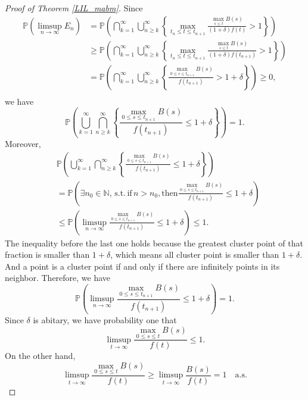 \documentclass[main.tex]{subfiles}
\begin{document}
\begin{proof}[Proof of Theorem \ref{LIL_mabm}]
Since
\begin{align*}
	\mathbb{P}(\limsup\limits_{n\to\infty}E_n) &= \mathbb{P}\left(\bigcap^\infty_{k=1}\bigcup^\infty_{n\geqslant k}\left\{\max\limits_{t_n\leqslant t\leqslant t_{n+1}}\frac{\max\limits_{s\leqslant t}B(s)}{(1+\delta)f(t)}>1\right\}\right)\\
	&\geqslant\mathbb{P}\left(\bigcap^\infty_{k=1}\bigcup^\infty_{n\geqslant k}\left\{\max\limits_{t_n\leqslant t\leqslant t_{n+1}}\frac{\max\limits_{s\leqslant t}B(s)}{(1+\delta)f(t_{n+1})}>1\right\}\right)\\
	&=\mathbb{P}\left(\bigcap^\infty_{k=1}\bigcup^\infty_{n\geqslant k}\left\{\frac{\max\limits_{0\leqslant s\leqslant t_{n+1}}B(s)}{f(t_{n+1})}>1+\delta\right\}\right)\geqslant0,\\
\end{align*}
we have
$$\mathbb{P}\left(\bigcup^\infty_{k=1}\bigcap^\infty_{n\geqslant k}\left\{\frac{\max\limits_{0\leqslant s\leqslant t_{n+1}}B(s)}{f(t_{n+1})}\leqslant1+\delta\right\}\right)=1.$$
Moreover,
\begin{align*}
	&\mathbb{P}\left(\bigcup^\infty_{k=1}\bigcap^\infty_{n\geqslant k}\left\{\frac{\max\limits_{0\leqslant s\leqslant t_{n+1}}B(s)}{f(t_{n+1})}\leqslant1+\delta\right\}\right)\\
	&=\mathbb{P}\left(\exists n_0\in\mathbb{N}, \,\mathrm{s.t.}\,\mathrm{if}\,n>n_0\mathrm{, then}\frac{\max\limits_{0\leqslant s\leqslant t_{n+1}}B(s)}{f(t_{n+1})}\leqslant1+\delta\right)\\
	&\leqslant\mathbb{P}\left(\limsup\limits_{n\to\infty}\frac{\max\limits_{0\leqslant s\leqslant t_{n+1}}B(s)}{f(t_{n+1})}\leqslant1+\delta\right)\leqslant1.
\end{align*}
The inequality before the last one holds because the greatest cluster point of that fraction is smaller than $1+\delta$, which means all cluster point is smaller than $1+\delta$. And a point is a cluster point if and only if there are infinitely points in its neighbor. Therefore, we have 
$$\mathbb{P}\left(\limsup\limits_{n\to\infty}\frac{\max\limits_{0\leqslant s\leqslant t_{n+1}}B(s)}{f(t_{n+1})}\leqslant1+\delta\right)=1.$$
Since $\delta$ is abitary, we have probability one that
\begin{equation}
\label{lilmbm1}
	\limsup\limits_{t\to\infty}\frac{\max\limits_{0\leqslant s\leqslant t}B(s)}{f(t)}\leqslant1.
\end{equation}
On the other hand, 
\begin{equation}
\label{lilmbm2}
	\limsup\limits_{t\to\infty}\frac{\max\limits_{0\leqslant s\leqslant t}B(s)}{f(t)}\geqslant\limsup\limits_{t\to\infty}\frac{B(s)}{f(t)}=1\quad\mathrm{a.s.}

\end{equation}
\end{proof}
\end{document}
